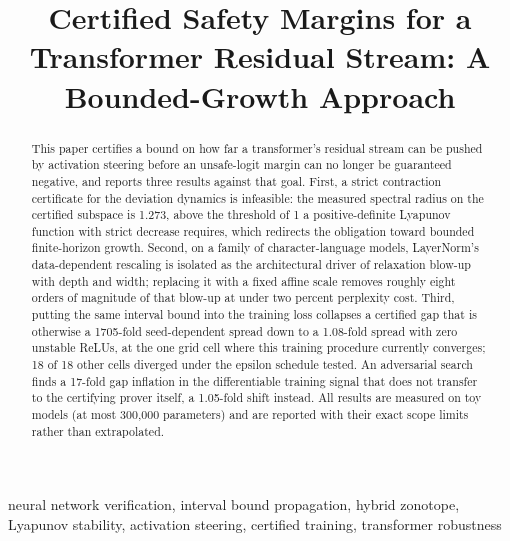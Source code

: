 \documentclass[10pt,journal]{IEEEtran}
\title{Certified Safety Margins for a Transformer Residual Stream: A Bounded-Growth Approach}
\author{\IEEEauthorblockN{Sehaj Randhir Singh}\IEEEauthorblockA{Independent Researcher}}
\begin{document}
\maketitle
\begin{abstract}
This paper certifies a bound on how far a transformer's residual stream can be pushed by activation steering before an unsafe-logit margin can no longer be guaranteed negative, and reports three results against that goal. First, a strict contraction certificate for the deviation dynamics is infeasible: the measured spectral radius on the certified subspace is 1.273, above the threshold of 1 a positive-definite Lyapunov function with strict decrease requires, which redirects the obligation toward bounded finite-horizon growth. Second, on a family of character-language models, LayerNorm's data-dependent rescaling is isolated as the architectural driver of relaxation blow-up with depth and width; replacing it with a fixed affine scale removes roughly eight orders of magnitude of that blow-up at under two percent perplexity cost. Third, putting the same interval bound into the training loss collapses a certified gap that is otherwise a 1705-fold seed-dependent spread down to a 1.08-fold spread with zero unstable ReLUs, at the one grid cell where this training procedure currently converges; 18 of 18 other cells diverged under the epsilon schedule tested. An adversarial search finds a 17-fold gap inflation in the differentiable training signal that does not transfer to the certifying prover itself, a 1.05-fold shift instead. All results are measured on toy models (at most 300,000 parameters) and are reported with their exact scope limits rather than extrapolated.
\end{abstract}
\begin{IEEEkeywords}
neural network verification, interval bound propagation, hybrid zonotope, Lyapunov stability, activation steering, certified training, transformer robustness
\end{IEEEkeywords}
\end{document}
